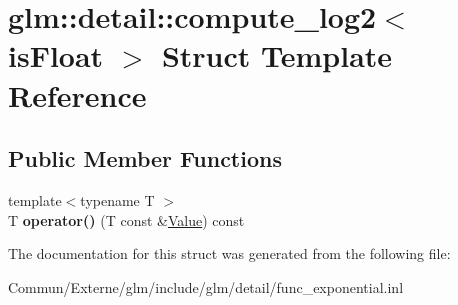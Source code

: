 \hypertarget{structglm_1_1detail_1_1compute__log2}{}\section{glm\+:\+:detail\+:\+:compute\+\_\+log2$<$ is\+Float $>$ Struct Template Reference}
\label{structglm_1_1detail_1_1compute__log2}
\subsection*{Public Member Functions}
\begin{DoxyCompactItemize}
\item 
{\footnotesize template$<$typename T $>$ }\\T {\bfseries operator()} (T const \&\hyperlink{document_8h_a071cf97155ba72ac9a1fc4ad7e63d481}{Value}) const \hypertarget{structglm_1_1detail_1_1compute__log2_a89ee0d494b7df86090055438a30bff32}{}\label{structglm_1_1detail_1_1compute__log2_a89ee0d494b7df86090055438a30bff32}

\end{DoxyCompactItemize}


The documentation for this struct was generated from the following file\+:\begin{DoxyCompactItemize}
\item 
Commun/\+Externe/glm/include/glm/detail/func\+\_\+exponential.\+inl\end{DoxyCompactItemize}
